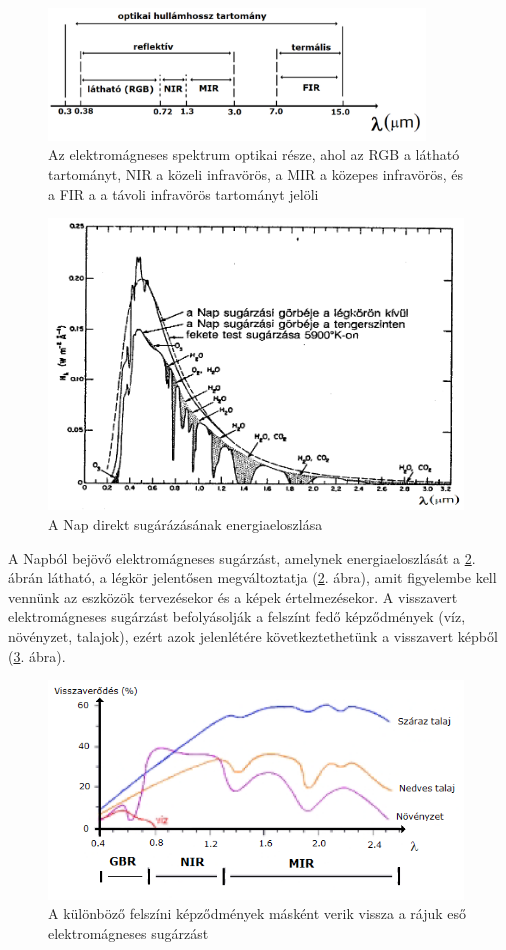 \documentclass[a4paper,12pt]{article}
\begin{document}
\begin{figure}[h]
	\centering
	\includegraphics[width=10cm]{rs1.png}
	\caption{Az elektromágneses spektrum optikai része, ahol az RGB a látható tartományt, NIR a közeli infravörös, a MIR a közepes infravörös, és a FIR a a távoli infravörös tartományt jelöli}
	\label{fig:rs1}
\end{figure}


\begin{figure}
	\centering
	\includegraphics[width=11cm]{rs11.png}
	\caption{A Nap direkt sugárázásának energiaeloszlása}
	\label{fig:rs11}
\end{figure}

A Napból bejövő elektromágneses sugárzást, amelynek energiaeloszlását a \ref{fig:rs11}. ábrán látható, a légkör jelentősen megváltoztatja (\ref{fig:rs11}. ábra), amit figyelembe kell vennünk az eszközök tervezésekor és a képek értelmezésekor. A visszavert elektromágneses sugárzást befolyásolják a felszínt fedő képződmények (víz, növényzet, talajok), ezért azok jelenlétére következtethetünk a visszavert képből (\ref{fig:rs3}. ábra).


\begin{figure}
	\centering
	\includegraphics[width=11cm]{rs3.png}
	\caption{A különböző felszíni képződmények másként verik vissza a rájuk eső elektromágneses sugárzást}
	\label{fig:rs3}
\end{figure}
\end{document}

